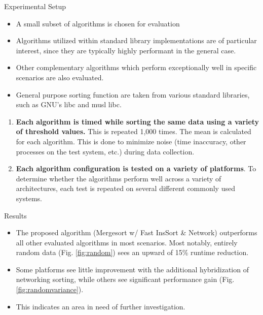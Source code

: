 \documentclass[final]{beamer}
\newlength{\colwidth}
\begin{document}
\begin{frame}[t]
\begin{columns}[t]
\begin{column}{\colwidth}
\begin{block}{Experimental Setup}
				\begin{itemize}
					\item A small subset of algorithms is chosen for evaluation
					\item Algorithms utilized within standard library implementations are
					      of particular interest, since they are typically highly
					      performant in the general case.
					\item Other complementary algorithms which perform exceptionally well
					      in specific scenarios are also evaluated.
					\item General purpose sorting function are taken from various standard
					      libraries, such as GNU's libc\parencite{glibc} and musl
					      libc\parencite{musl_libc}.
				\end{itemize}
				\begin{enumerate}
					\item \textbf{Each algorithm is timed while sorting the same data
						      using a variety of threshold values.} This is repeated 1,000
					      times. The mean is calculated for each algorithm. This is done
					      to minimize noise (time inaccuracy, other processes on the test
					      system, etc.) during data collection.
					\item \textbf{Each algorithm configuration is tested on a variety of
						      platforms}. To determine whether the algorithms perform well
					      across a variety of architectures, each test is repeated on
					      several different commonly used systems.
				\end{enumerate}
			\end{block}

			\begin{block}{Results}
				\begin{itemize}
					\item The proposed algorithm (Mergesort w/ Fast InsSort \& Network)
					      outperforms all other evaluated algorithms in most scenarios.
					      Most notably, entirely random data (Fig. \ref{fig:random}) sees
					      an upward of 15\% runtime reduction.
					\item Some platforms see little improvement with the additional
					      hybridization of networking sorting, while others see
					      significant performance gain (Fig. \ref{fig:randomvariance}).
					\item This indicates an area in need of further investigation.
				\end{itemize}


\end{block}
\end{column}
\end{columns}
\end{frame}
\end{document}
